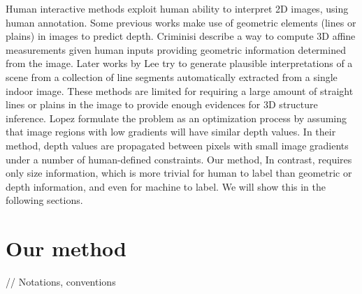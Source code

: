 \documentclass[10pt,twocolumn,letterpaper]{article}
\begin{document}
Human interactive methods exploit human ability to interpret 2D images, using human annotation. Some previous works make use of geometric elements (lines or plains) in images to predict depth. Criminisi \etal \cite{Criminisi2000} describe a way to compute 3D affine measurements given human inputs providing geometric information determined from the image. Later works \cite{Lee2009GeometricRF} by Lee \etal try to generate plausible interpretations of a scene from a collection of line segments automatically extracted from a single indoor image. These methods are limited for requiring a large amount of straight lines or plains in the image to provide enough evidences for 3D structure inference. Lopez \etal \cite{ceig.20141109} formulate the problem as an optimization process by assuming that image regions with low gradients will have similar depth values. In their method, depth values are propagated between pixels with small image gradients under a number of human-defined constraints. Our method, In contrast, requires only size information, which is more trivial for human to label than geometric or depth information, and even for machine to label. We will show this in the following sections.

\section{Our method}
// Notations, conventions
\end{document}
